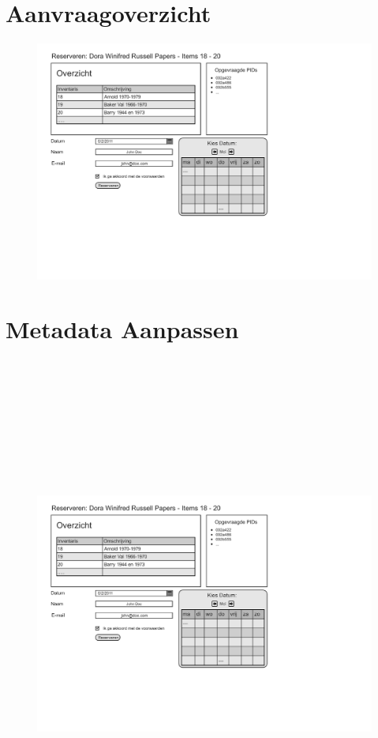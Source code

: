 \documentclass[a4paper,titlepage]{report}
\makeatletter
\def\namedlabel#1#2{
  \label{#1}
  \begingroup
   \def\@currentlabel{#2}%
   \label{#1:name}\endgroup
}
\makeatother
\begin{document}
\section{Aanvraagoverzicht}
\namedlabel{ui:overzicht}{Aanvraagoverzicht}
\begin{figure}[H]
  \includegraphics[totalheight=150mm,angle=90,page=3]{ui.pdf}
\end{figure}


\section{Metadata Aanpassen}
\namedlabel{ui:metadata}{Metadata Aanpassen}
\begin{figure}[H]
  \includegraphics[height=170mm,page=5]{ui.pdf}
\end{figure}
\end{document}
